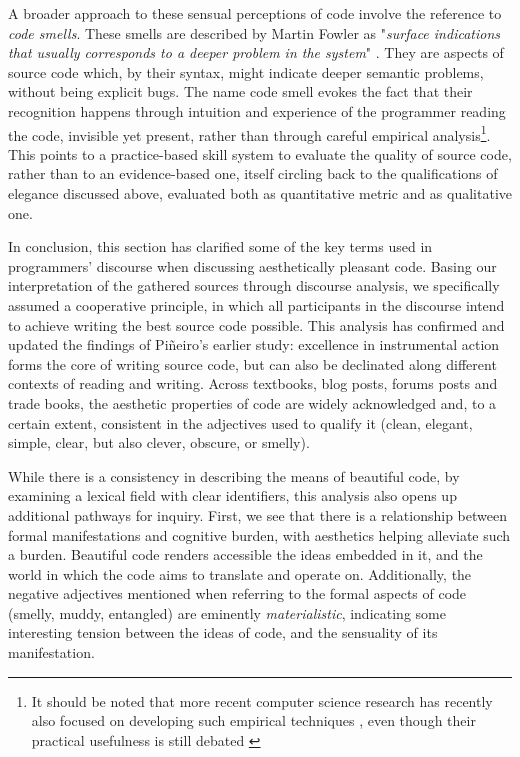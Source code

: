 A broader approach to these sensual perceptions of code involve the reference to \emph{code smells}. These smells are described by Martin Fowler as "\emph{surface indications that usually corresponds to a deeper problem in the system}" \citep{fowler_refactoring_1999}. They are aspects of source code which, by their syntax, might indicate deeper semantic problems, without being explicit bugs. The name code smell evokes the fact that their recognition happens through intuition and experience of the programmer reading the code, invisible yet present, rather than through careful empirical analysis\footnote{It should be noted that more recent computer science research has recently also focused on developing such empirical techniques \citep{rasool_review_2015}, even though their practical usefulness is still debated \citep{santos_systematic_2018}}. This points to a practice-based skill system to evaluate the quality of source code, rather than to an evidence-based one, itself circling back to the qualifications of elegance discussed above, evaluated both as quantitative metric and as qualitative one.

In conclusion, this section has clarified some of the key terms used in programmers' discourse when discussing aesthetically pleasant code. Basing our interpretation of the gathered sources through discourse analysis, we specifically assumed a cooperative principle, in which all participants in the discourse intend to achieve writing the best source code possible. This analysis has confirmed and updated the findings of Piñeiro's earlier study: excellence in instrumental action forms the core of writing source code, but can also be declinated along different contexts of reading and writing. Across textbooks, blog posts, forums posts and trade books, the aesthetic properties of code are widely acknowledged and, to a certain extent, consistent in the adjectives used to qualify it (clean, elegant, simple, clear, but also clever, obscure, or smelly).

While there is a consistency in describing the means of beautiful code, by examining a lexical field with clear identifiers, this analysis also opens up additional pathways for inquiry. First, we see that there is a relationship between formal manifestations and cognitive burden, with aesthetics helping alleviate such a burden. Beautiful code renders accessible the ideas embedded in it, and the world in which the code aims to translate and operate on. Additionally, the negative adjectives mentioned when referring to the formal aspects of code (smelly, muddy, entangled) are eminently \emph{materialistic}, indicating some interesting tension between the ideas of code, and the sensuality of its manifestation.

